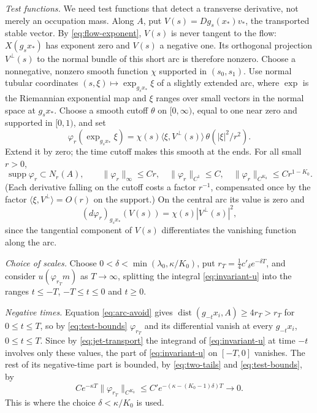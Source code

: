 \documentclass[11pt]{article}
\theoremstyle{remark}
\newcommand{\dist}{\operatorname{dist}}
\newcommand{\supp}{\operatorname{supp}}
\begin{document}
\emph{Test functions.}
We need test functions that detect a transverse derivative, not
merely an occupation mass.
Along \(A\), put \(V(s)=Dg_s(x_*)v_*\), the transported stable vector.
By \eqref{eq:flow-exponent}, \(V(s)\) is never tangent to the flow:
\(X(g_sx_*)\) has exponent zero and \(V(s)\) a negative one.
Its orthogonal projection \(V^\perp(s)\) to the normal bundle of
this short arc is therefore nonzero.
Choose a nonnegative, nonzero smooth function
\(\chi\) supported in \((s_0,s_1)\).
Use normal tubular coordinates \((s,\xi)\mapsto\exp_{g_sx_*}\xi\) of a
slightly extended arc, where \(\exp\) is the Riemannian exponential
map and \(\xi\) ranges over small vectors in the normal space at
\(g_sx_*\).  Choose a smooth cutoff \(\theta\) on \([0,\infty)\),
equal to one near zero and supported in \([0,1)\), and set
\begin{equation}\label{eq:arc-test}
 \varphi_r(\exp_{g_sx_*}\xi)=
    \chi(s)\langle \xi,V^\perp(s)\rangle\,
                     \theta(|\xi|^2/r^2).
\end{equation}
Extend it by zero; the time cutoff makes this smooth at the ends.
For all small \(r>0\),
\begin{equation}\label{eq:test-bounds}
 \supp\varphi_r\subset N_r(A),\qquad
 \|\varphi_r\|_\infty\le Cr,\quad
 \|\varphi_r\|_{C^1}\le C,\quad
 \|\varphi_r\|_{C^{K_0}}\le Cr^{1-K_0}.
\end{equation}
(Each derivative falling on the cutoff costs a factor \(r^{-1}\),
compensated once by the factor \(\langle \xi,V^\perp\rangle=O(r)\) on
the support.)
On the central arc its value is zero and
\begin{equation}\label{eq:test-gradient}
 (d\varphi_r)_{g_sx_*}(V(s))
                      =\chi(s)|V^\perp(s)|^2,
\end{equation}
since the tangential component of \(V(s)\) differentiates the
vanishing function along the arc.

\emph{Choice of scales.}
Choose \(0<\delta<\min(\lambda_0,\kappa/K_0)\), put
\(r_T=\tfrac14c'_\delta e^{-\delta T}\),
and consider \(u(\varphi_{r_T}m)\) as \(T\to\infty\), splitting the
integral \eqref{eq:invariant-u} into the ranges \(t\le-T\),
\(-T\le t\le0\) and \(t\ge0\).

\emph{Negative times.}
Equation \eqref{eq:arc-avoid} gives
\(\dist(g_{-t}x_i,A)\ge4r_{T}>r_T\) for \(0\le t\le T\), so by
\eqref{eq:test-bounds} \(\varphi_{r_T}\) and its differential vanish
at every \(g_{-t}x_i\), \(0\le t\le T\).  Since by
\eqref{eq:jet-transport} the integrand of \eqref{eq:invariant-u} at
time \(-t\) involves only these values, the part of
\eqref{eq:invariant-u} on \([-T,0]\) vanishes.
The rest of its negative-time part is bounded, by \eqref{eq:two-tails}
and \eqref{eq:test-bounds}, by
\[
 C e^{-\kappa T}\|\varphi_{r_T}\|_{C^{K_0}}
 \le C'e^{-(\kappa-(K_0-1)\delta)T}\longrightarrow0.
\]
This is where the choice \(\delta<\kappa/K_0\) is used.
\end{document}
